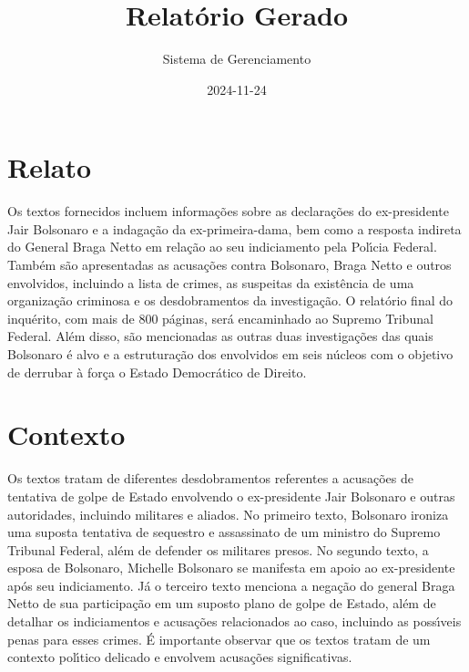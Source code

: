 \documentclass[article,11pt,oneside,a4paper,brazil,sumario=tradicional]{abntex2}%
\title{Relatório Gerado}%
\author{Sistema de Gerenciamento}%
\date{2024{-}11{-}24}%
\begin{document}
%
\normalsize%
\maketitle%
%
\frenchspacing%
\section{Relato}%
\label{sec:Relato}%
Os textos fornecidos incluem informa\c{c}\~oes sobre as declara\c{c}\~oes do ex-presidente Jair Bolsonaro e a indaga\c{c}\~ao da ex-primeira-dama, bem como a resposta indireta do General Braga Netto em rela\c{c}\~ao ao seu indiciamento pela Pol{\'\i}cia Federal. Tamb\'em s\~ao apresentadas as acusa\c{c}\~oes contra Bolsonaro, Braga Netto e outros envolvidos, incluindo a lista de crimes, as suspeitas da exist\^encia de uma organiza\c{c}\~ao criminosa e os desdobramentos da investiga\c{c}\~ao. O relat\'orio final do inqu\'erito, com mais de 800 p\'aginas, ser\'a encaminhado ao Supremo Tribunal Federal. Al\'em disso, s\~ao mencionadas as outras duas investiga\c{c}\~oes das quais Bolsonaro \'e alvo e a estrutura\c{c}\~ao dos envolvidos em seis n\'ucleos com o objetivo de derrubar \`a for\c{c}a o Estado Democr\'atico de Direito.

%
\section{Contexto}%
\label{sec:Contexto}%
Os textos tratam de diferentes desdobramentos referentes a acusa\c{c}\~oes de tentativa de golpe de Estado envolvendo o ex-presidente Jair Bolsonaro e outras autoridades, incluindo militares e aliados. No primeiro texto, Bolsonaro ironiza uma suposta tentativa de sequestro e assassinato de um ministro do Supremo Tribunal Federal, al\'em de defender os militares presos. No segundo texto, a esposa de Bolsonaro, Michelle Bolsonaro se manifesta em apoio ao ex-presidente ap\'os seu indiciamento. J\'a o terceiro texto menciona a nega\c{c}\~ao do general Braga Netto de sua participa\c{c}\~ao em um suposto plano de golpe de Estado, al\'em de detalhar os indiciamentos e acusa\c{c}\~oes relacionados ao caso, incluindo as poss{\'\i}veis penas para esses crimes. \'E importante observar que os textos tratam de um contexto pol{\'\i}tico delicado e envolvem acusa\c{c}\~oes significativas.

%
\end{document}
